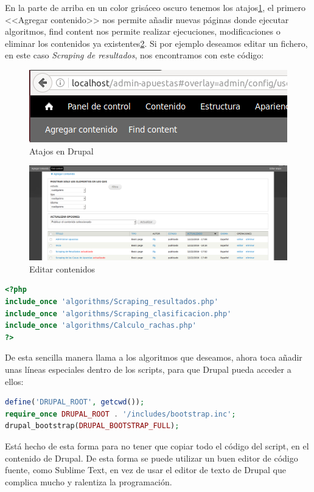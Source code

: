 En la parte de arriba en un color grisáceo oscuro tenemos los atajos\ref{fig:AtajDru}, el primero <<Agregar contenido>> nos permite añadir nuevas páginas donde ejecutar algoritmos, find content nos permite realizar ejecuciones, modificaciones o eliminar los contenidos ya existentes\ref{fig:FindCont}. Si por ejemplo deseamos editar un fichero, en este caso \textit{Scraping de resultados}, nos encontramos con este código: 
\begin{figure}
\centering
\includegraphics[width=.9\textwidth]{img/drupal_atajos}
\caption{Atajos en Drupal}
\label{fig:AtajDru}
\end{figure}
\begin{figure}
\centering
\includegraphics[width=.9\textwidth]{img/drupal_find_content}
\caption{Editar contenidos}
\label{fig:FindCont}
\end{figure}
\begin{lstlisting}[language=php,keywordstyle=\color{black}]
<?php
include_once 'algorithms/Scraping_resultados.php'
include_once 'algorithms/Scraping_clasificacion.php'
include_once 'algorithms/Calculo_rachas.php'
?>
\end{lstlisting}
De esta sencilla manera llama a los algoritmos que deseamos, ahora toca añadir unas líneas especiales dentro de los scripts, para que Drupal pueda acceder a ellos:
\begin{lstlisting}[language=php,keywordstyle=\color{black}]
define('DRUPAL_ROOT', getcwd());
require_once DRUPAL_ROOT . '/includes/bootstrap.inc';
drupal_bootstrap(DRUPAL_BOOTSTRAP_FULL);
\end{lstlisting}
Está hecho de esta forma para no tener que copiar todo el código del script, en el contenido de Drupal. De esta forma se puede utilizar un buen editor de código fuente, como Sublime Text, en vez de usar el editor de texto de Drupal que complica mucho y ralentiza la programación.

